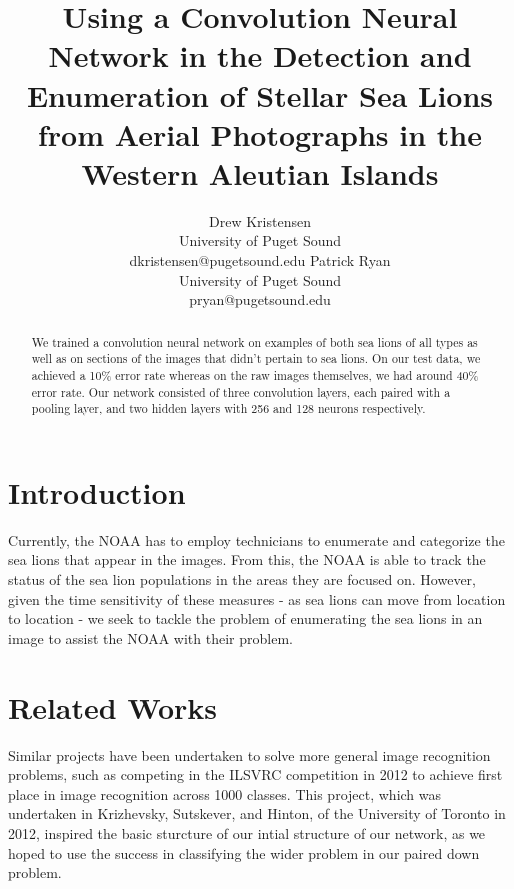 \documentclass[letterpaper]{article}
\begin{document}
%
\title{Using a Convolution Neural Network in the Detection and Enumeration of Stellar Sea Lions from Aerial Photographs in the Western Aleutian Islands}
\author{
Drew Kristensen \\
University of Puget Sound\\
dkristensen@pugetsound.edu
\And
Patrick Ryan\\
University of Puget Sound\\
pryan@pugetsound.edu
}

\maketitle
\begin{abstract}
We trained a convolution neural network on examples of both sea lions of all types as well as on sections of the images that didn't pertain to sea lions. On our test data, we achieved a 10\% error rate whereas on the raw images themselves, we had around 40\% error rate. Our network consisted of three convolution layers, each paired with a pooling layer, and two hidden layers with 256 and 128 neurons respectively.
\end{abstract}

\section{Introduction}
Currently, the NOAA has to employ technicians to enumerate and categorize the sea lions that appear in the images. From this, the NOAA is able to track the status of the sea lion populations in the areas they are focused on. However, given the time sensitivity of these measures - as sea lions can move from location to location - we seek to tackle the problem of enumerating the sea lions in an image to assist the NOAA with their problem.

\section{Related Works}
Similar projects have been undertaken to solve more general image recognition problems, such as competing in the ILSVRC competition in 2012 to achieve first place in image recognition across 1000 classes. This project, which was undertaken in Krizhevsky, Sutskever, and Hinton, of the University of Toronto in 2012, inspired the basic sturcture of our intial structure of our network, as we hoped to use the success in classifying the wider problem in our paired down problem.
\end{document}
